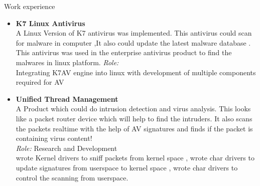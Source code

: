 \documentclass{resume}
\begin{document}
\begin{category}{Work experience}
\begin{itemize}
  \item{{\bfseries K7 Linux Antivirus}\\
  A Linux Version of K7 antivirus was implemented. 
  This antivirus could scan for malware in computer ,It also could update
  the latest malware database . This antivirus was used in the enterprise antivirus
  product to find the malwares in linux platform.
  {\it Role:}\\
  Integrating K7AV engine into linux with development of multiple components required for AV\\
  }

  \item {{\bfseries Unified Thread Management}\\
  A Product which could do intrusion detection and virus analysis.
  This looks like a packet router device which will help to find the intruders.
  It also scans the packets realtime with the help of AV signatures and finds if 
  the packet is containing virus content!\\
  {\it Role:}
  Research and Development\\
  wrote Kernel drivers to sniff packets from kernel space , wrote char drivers to 
  update signatures from userspace to kernel space , wrote char drivers to control
  the scanning from userspace.\\
  }

  \end{itemize}

\end{category}
\end{document}
